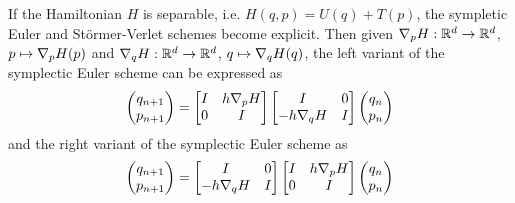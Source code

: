 \documentclass[twoside,a4paper]{article}
\begin{document}
If the Hamiltonian $H$ is separable, i.e. $H(q,p) = U(q) + T(p)$, the sympletic Euler and Störmer-Verlet
schemes become explicit. Then given $\grad[p]{H} : \mathbb{R}^d \to \mathbb{R}^d$, $p \mapsto \grad[p]{H}(p)$ 
and $\grad[q]{H} : \mathbb{R}^d \to \mathbb{R}^d$, $q \mapsto \grad[q]{H}(q)$,
the left variant of the symplectic Euler scheme can be expressed as
\begin{equation*}
	\begin{pmatrix}
		q_{n+1} \\
		p_{n+1}
	\end{pmatrix} =
	\begin{bmatrix}
		I & h \grad[p]{H} \\
		0 & I
	\end{bmatrix} \begin{bmatrix}
		I & 0 \\
		-h \grad[q]{H} & I
	\end{bmatrix}
	\begin{pmatrix}
		q_{n} \\
		p_{n}
	\end{pmatrix} 
\end{equation*}
and the right variant of the symplectic Euler scheme as
\begin{equation*}
	\begin{pmatrix}
		q_{n+1} \\
		p_{n+1}
	\end{pmatrix} =
	\begin{bmatrix}
		I & 0 \\
		-h \grad[q]{H} & I
	\end{bmatrix}
	\begin{bmatrix}
		I & h \grad[p]{H} \\
		0 & I
	\end{bmatrix}
	\begin{pmatrix}
		q_{n} \\
		p_{n}
	\end{pmatrix}
\end{equation*}
\end{document}
